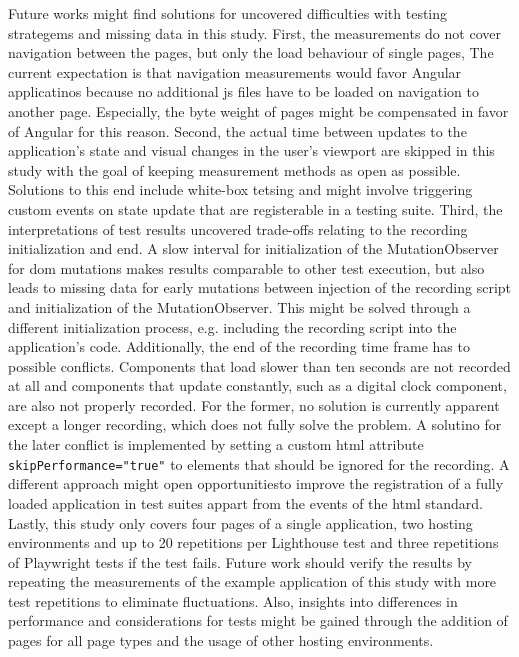 \documentclass[a4paper, 12pt]{article}
\begin{document}
Future works might find solutions for uncovered difficulties with testing strategems and missing data in this study.
First, the measurements do not cover navigation between the pages, but only the load behaviour of single pages,
The current expectation is that navigation measurements would favor Angular applicatinos because no additional \acrlong{js} files have to be loaded on navigation to another page.
Especially, the byte weight of pages might be compensated in favor of Angular for this reason.
Second, the actual time between updates to the application's state and visual changes in the user's viewport are skipped in this study with the goal of keeping measurement methods as open as possible.
Solutions to this end include white-box tetsing and might involve triggering custom events on state update that are registerable in a testing suite.
Third, the interpretations of test results uncovered trade-offs relating to the recording initialization and end.
A slow interval for initialization of the MutationObserver for \acrshort{dom} mutations makes results comparable to other test execution, but also leads to missing data for early mutations between injection of the recording script and initialization of the MutationObserver.
This might be solved through a different initialization process, e.g. including the recording script into the application's code.
Additionally, the end of the recording time frame has to possible conflicts.
Components that load slower than ten seconds are not recorded at all and components that update constantly, such as a digital clock component, are also not properly recorded.
For the former, no solution is currently apparent except a longer recording, which does not fully solve the problem.
A solutino for the later conflict is implemented by setting a custom \acrshort{html} attribute \verb|skipPerformance="true"| to elements that should be ignored for the recording.
A different approach might open opportunitiesto improve the registration of a fully loaded application in test suites appart from the events of the \acrshort{html} standard.
Lastly, this study only covers four pages of a single application, two hosting environments and up to 20 repetitions per Lighthouse test and three repetitions of Playwright tests if the test fails.
Future work should verify the results by repeating the measurements of the example application of this study with more test repetitions to eliminate fluctuations.
Also, insights into differences in performance and considerations for tests might be gained through the addition of pages for all page types and the usage of other hosting environments. 
\end{document}
